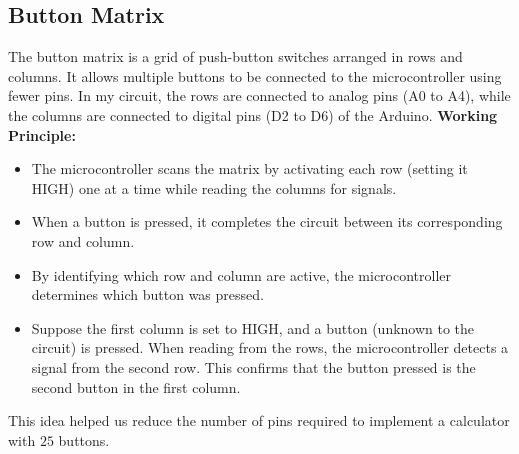 \documentclass[a4paper,12pt]{article}
\begin{document}
\subsection*{Button Matrix}
The button matrix is a grid of push-button switches arranged in rows and columns. It allows multiple buttons to be connected to the microcontroller using fewer pins. In my circuit, the rows are connected to analog pins (A0 to A4), while the columns are connected to digital pins (D2 to D6) of the Arduino.\newline
\textbf{Working Principle:}
\begin{itemize}
    \item The microcontroller scans the matrix by activating each row (setting it HIGH) one at a time while reading the columns for signals.
    \item When a button is pressed, it completes the circuit between its corresponding row and column.
    \item By identifying which row and column are active, the microcontroller determines which button was pressed.
    \item Suppose the first column is set to \( \text{HIGH} \), and a button (unknown to the circuit) is pressed. When reading from the rows, the microcontroller detects a signal from the second row. This confirms that the button pressed is the second button in the first column.
\end{itemize}
This idea helped us reduce the number of pins required to implement a calculator with $25$ buttons.
\end{document}
